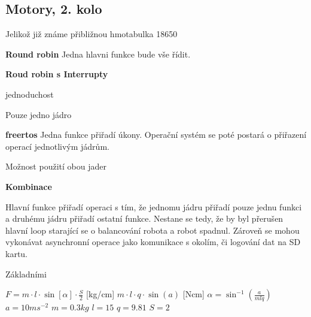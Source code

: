 \subsection{Motory, 2. kolo }
Jelikož již známe přibližnou hmotabulka 18650

\textbf{Round robin}
Jedna hlavni funkce bude vše řídit.

\textbf{Roud robin s Interrupty}

jednoduchost

Pouze jedno jádro

\textbf{\ac{freertos}}
Jedna funkce přiřadí úkony. Operační systém se poté postará o přiřazení operací jednotlivým jádrům.

Možnost použití obou jader


\textbf{Kombinace}

Hlavní funkce přiřadí operaci s tím, že jednomu jádru přiřadí pouze jednu funkci a druhému jádru přiřadí ostatní funkce. Nestane se tedy, že by byl přerušen hlavní loop starající se o balancování robota a robot spadnul. Zároveň se mohou vykonávat asynchronní operace jako komunikace s okolím, či logování dat na SD kartu.

Základními

$F=m\cdot l\cdot\sin\left[ \alpha \right] \cdot\frac{S}{2}$ [kg/cm]
$m\cdot l\cdot q\cdot\sin\left(a\right)$ [Ncm]
$\alpha=\sin^{-1}\left(\frac{a}{mlq}\right)$
$a=10ms^{-2}$
$m=0.3kg$
$l=15$
$q=9.81$
$S=2$